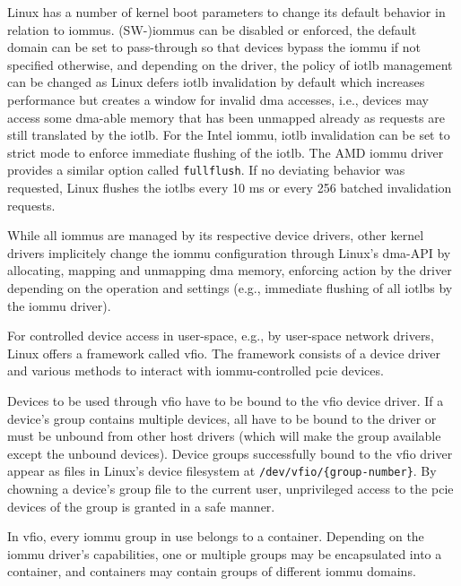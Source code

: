 Linux has a number of kernel boot parameters to change its default behavior in
relation to \acp{iommu}. (SW-)\acp{iommu} can be disabled or enforced, the
default domain can be set to pass-through so that devices bypass the \ac{iommu}
if not specified otherwise, and depending on the driver, the policy of
\ac{iotlb} management can be changed as Linux defers \ac{iotlb} invalidation by
default which increases performance but creates a window for invalid \ac{dma}
accesses, i.e., devices may access some \ac{dma}-able memory that has been
unmapped already as requests are still translated by the \ac{iotlb}. For the
Intel \ac{iommu}, \ac{iotlb} invalidation can be set to strict mode to enforce
immediate flushing of the \ac{iotlb}. The AMD \ac{iommu} driver provides a
similar option called \texttt{fullflush}. If no deviating behavior was
requested, Linux flushes the \acp{iotlb} every 10 ms or every 256 batched
invalidation requests.

While all \acp{iommu} are managed by its respective device drivers, other kernel
drivers implicitely change the \ac{iommu} configuration through Linux's
\ac{dma}-API by allocating, mapping and unmapping \ac{dma} memory, enforcing
action by the driver depending on the operation and settings (e.g., immediate
flushing of all \acp{iotlb} by the \ac{iommu} driver).

For controlled device access in user-space, e.g., by user-space network drivers,
Linux offers a framework called \ac{vfio}. The framework consists of a device
driver and various methods to interact with \ac{iommu}-controlled \ac{pcie}
devices.

Devices to be used through \ac{vfio} have to be bound to the \ac{vfio} device
driver. If a device's group contains multiple devices, all have to be bound to
the driver or must be unbound from other host drivers (which will make the group
available except the unbound devices). Device groups successfully bound to the
\ac{vfio} driver appear as files in Linux's device filesystem at \linebreak
\texttt{/dev/vfio/\{group-number\}}. By chowning a device's group file to the
current user, unprivileged access to the \ac{pcie} devices of the group is
granted in a safe manner.

In \ac{vfio}, every \ac{iommu} group in use belongs to a container. Depending on
the \ac{iommu} driver's capabilities, one or multiple groups may be encapsulated
into a container, and containers may contain groups of different \ac{iommu}
domains.

